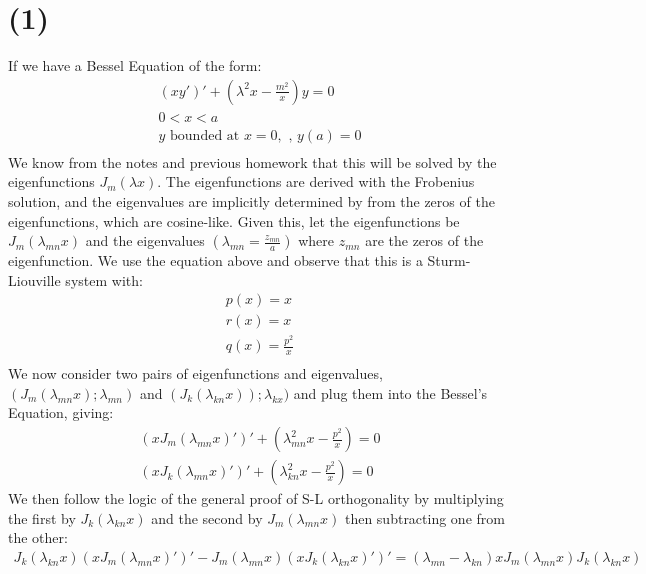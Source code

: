 \documentclass{article}
\begin{document}
\section*{\textbf{(1)}}
If we have a Bessel Equation of the form:
\begin{equation}
\begin{aligned}
(xy')' + (\lambda^2x - \frac{m^2}{x})y = 0\\
0 < x < a\\
y \text{ bounded at } x = 0, \text{ , } y(a) = 0\\
\end{aligned}
\end{equation}
We know from the notes and previous homework that this will be solved by the eigenfunctions $J_m(\lambda x)$. The eigenfunctions are derived with the Frobenius solution, and the eigenvalues are implicitly determined by from the zeros of the eigenfunctions, which are cosine-like. Given this, let the eigenfunctions be $J_m(\lambda_{mn}x)$ and the eigenvalues $(\lambda_{mn} = \frac{z_{mn}}{a})$ where $z_{mn}$ are the zeros of the eigenfunction. We use the equation above and observe that this is a Sturm-Liouville  system with:
\begin{equation}
\begin{aligned}
p(x) = x\\
r(x) = x\\
q(x) = \frac{p^2}{x}\\
\end{aligned}
\end{equation}
We now consider two pairs of eigenfunctions and eigenvalues, $(J_m(\lambda_{mn}x);\lambda_{mn})$ and $(J_k(\lambda_{kn}x)); \lambda_{kx})$ and plug them into the Bessel's Equation, giving:
\begin{equation}
\begin{aligned}
(xJ_m(\lambda_{mn}x)')' + (\lambda_{mn}^2x - \frac{p^2}{x}) = 0\\
(xJ_k(\lambda_{mn}x)')' + (\lambda_{kn}^2x - \frac{p^2}{x}) = 0
\end{aligned}
\end{equation}
We then follow the logic of the general proof of S-L orthogonality by multiplying the first by $J_k(\lambda_{kn}x)$ and the second by $J_m(\lambda_{mn}x)$ then subtracting one from the other:
\begin{equation}
\begin{aligned}
J_k(\lambda_{kn}x) (xJ_m(\lambda_{mn}x)')' - J_m(\lambda_{mn}x)(xJ_k(\lambda_{kn}x)')' = (\lambda_{mn} - \lambda_{kn})xJ_m(\lambda_{mn}x)J_k(\lambda_{kn}x)\\
\end{aligned}
\end{equation}
\end{document}
